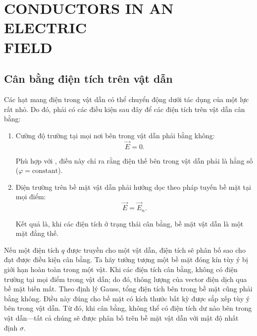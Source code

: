 

\chapter[CONDUCTORS IN AN ELECTRIC FIELD]{CONDUCTORS IN AN ELECTRIC \\FIELD}\label{chap:3}


\section{Cân bằng điện tích trên vật dẫn}\label{sec:3_1}

Các hạt mang điện trong vật dẫn có thể chuyển động dưới tác dụng của một lực rất nhỏ. Do đó, phải có các điều kiện sau đây để các điện tích trên vật dẫn cân bằng:
\begin{enumerate}[1.]
    \item Cường độ trường tại mọi nơi bên trong vật dẫn phải bằng không:
    \begin{equation}\label{eq:3_1}
        \vec{E} = 0.
    \end{equation}

    \noindent
    Phù hợp với , điều này chỉ ra rằng điện thế bên trong vật dẫn phải là hằng số ($\varphi=\text{constant}$).

    \item Điện trường trên bề mặt vật dẫn phải hướng dọc theo pháp tuyến bề mặt tại mọi điểm:
    \begin{equation}\label{eq:3_2}
        \vec{E} = \vec{E}_n.
    \end{equation}

    \noindent
    Kết quả là, khi các điện tích ở trạng thái cân bằng, bề mặt vật dẫn là một mặt đẳng thế.
\end{enumerate}

Nếu một điện tích $q$ được truyền cho một vật dẫn, điện tích sẽ phân bố sao cho đạt được điều kiện cân bằng. Ta hãy tưởng tượng một bề mặt đóng kín tùy ý bị giới hạn hoàn toàn trong một vật. Khi các điện tích cân bằng, không có điện trường tại mọi điểm trong vật dẫn; do đó, thông lượng của vector điện dịch qua bề mặt biến mất. Theo định lý Gauss, tổng điện tích bên trong bề mặt cũng phải bằng không. Điều này đúng cho bề mặt có kích thước bất kỳ được sắp xếp tùy ý bên trong vật dẫn. Từ đó, khi cân bằng, không thể có điện tích dư nào bên trong vật dẫn---tất cả chúng sẽ được phân bố trên bề mặt vật dẫn với mật độ nhất định $\sigma$.

